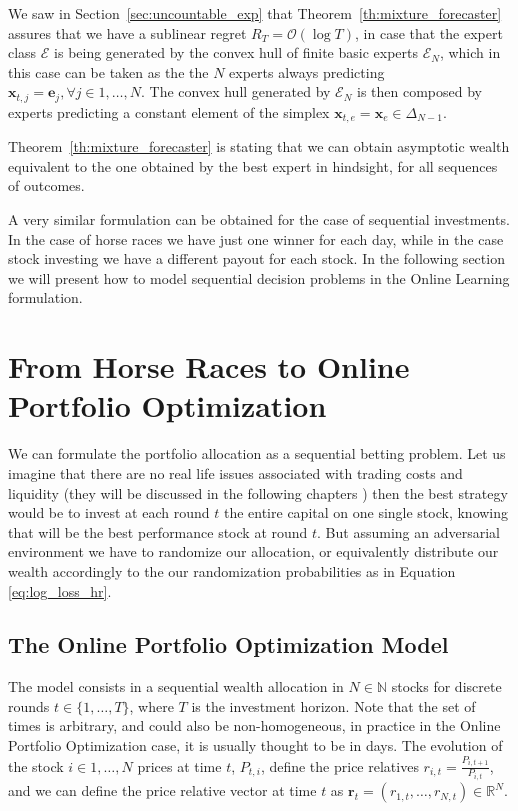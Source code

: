 We saw in Section~\ref{sec:uncountable_exp} that Theorem~\ref{th:mixture_forecaster} assures that we have a sublinear regret $R_T=\mathcal O(\log T)$, in case that the expert class $\mathcal E$ is being generated by the convex hull of finite basic experts $\mathcal E_N$, which in this case can be taken as the the $N$ experts always predicting $\mathbf x_{t,j}=\mathbf e_j, \forall j\in 1,\ldots,N$. The convex hull generated by $\mathcal E_N$ is then composed by experts predicting a constant element of the simplex $\mathbf x_{t,e}=\mathbf x_e\in \Delta_{N-1}$. 

Theorem~\ref{th:mixture_forecaster} is stating that we can obtain asymptotic wealth equivalent to the one obtained by the best expert in hindsight, for all sequences of outcomes. 

A very similar formulation can be obtained for the case of sequential investments. In the case of horse races we have just one winner for each day, while in the case stock investing we have a different payout for each stock. In the following section we will present how to model sequential decision problems in the Online Learning formulation.

\section{From Horse Races to Online Portfolio Optimization}

We can formulate the portfolio allocation as a sequential betting problem. Let us imagine that there are no real life issues associated with trading costs and liquidity (they will be discussed in the following chapters ) then the best strategy would be to invest at each round $t$ the entire capital on one single stock, knowing that will be the best performance stock at round $t$. But assuming an adversarial environment we have to randomize our allocation, or equivalently distribute our wealth accordingly to the our randomization probabilities  as in Equation \eqref{eq:log_loss_hr}. 

\subsection{The Online Portfolio Optimization Model}

The model consists in a sequential wealth allocation in $N\in\mathbb N$ stocks for discrete rounds $t\in\{1,\ldots,T\}$, where $T$ is the investment horizon. Note that the set of times is arbitrary, and could also be non-homogeneous, in practice in the Online Portfolio Optimization case, it is usually thought to be in days. The evolution of the stock $i\in 1,\ldots,N$ prices at time $t$, $P_{t,i}$, define the price relatives $r_{i,t}=\frac{P_{i,t+1}}{P_{i,t}}$, and we can define the price relative vector at time $t$ as $\mathbf r_t=(r_{1,t},\ldots,r_{N,t})\in\mathbb R^N$. 

